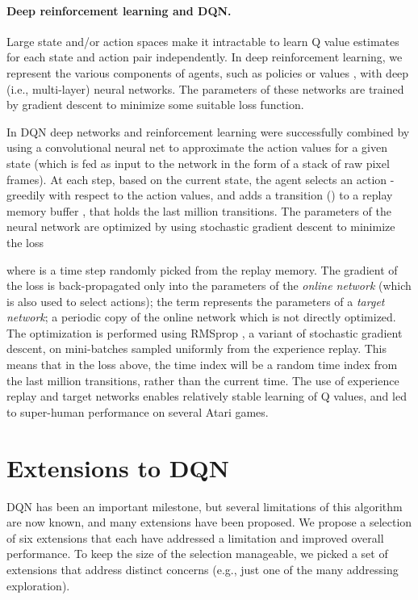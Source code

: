 \documentclass[letterpaper]{article} \usepackage{aaai18}  \usepackage{times}  \usepackage{helvet}  \usepackage{courier}  \usepackage{url}  \usepackage{graphicx}  \usepackage{amsmath,amssymb}
\begin{document}
\paragraph{Deep reinforcement learning and DQN.}
Large state and/or action spaces make it intractable to learn Q value estimates for each state and action pair independently. 
In deep reinforcement learning, we represent the various components of agents, such as policies  or values , with deep (i.e., multi-layer) neural networks. The parameters of these networks are trained by gradient descent to minimize some suitable loss function.

In DQN \cite{Mnih2015} deep networks and reinforcement learning were successfully combined by using a convolutional neural net to approximate the action values for a given state  (which is fed as input to the network in the form of a stack of raw pixel frames). At each step, based on the current state, the agent selects an action -greedily with respect to the action values, and adds a transition () to a replay memory buffer \cite{Lin1992}, that holds the last million transitions.  The parameters of the neural network are optimized by using stochastic gradient descent to minimize the loss

where  is a time step randomly picked from the replay memory.
The gradient of the loss is back-propagated only into the parameters  of the \textit{online network} (which is also used to select actions); the term  represents the parameters of a \textit{target network}; a periodic copy of the online network which is not directly optimized. The optimization is performed using RMSprop \cite{tieleman2012lecture}, a variant of stochastic gradient descent, on mini-batches sampled uniformly from the experience replay. This means that in the loss above, the time index  will be a random time index from the last million transitions, rather than the current time. The use of experience replay and target networks enables relatively stable learning of Q values, and led to super-human performance on several Atari games.

\section{Extensions to DQN}
DQN has been an important milestone, but several limitations of this algorithm are now known, and many extensions have been proposed.
We propose a selection of six extensions that each have addressed a limitation and improved overall performance. 
To keep the size of the selection manageable, we picked a set of extensions that address distinct concerns (e.g., just one of the many addressing exploration).
\end{document}
